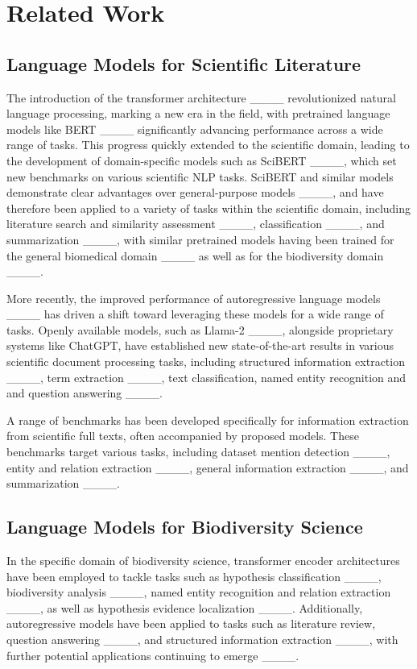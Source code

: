 \section{Related Work}
\label{sec:2}

\subsection{Language Models for Scientific Literature}%

The introduction of the transformer architecture ____ revolutionized natural language processing, marking a new era in the field, with pretrained language models like BERT ____ significantly advancing performance across a wide range of tasks. This progress quickly extended to the scientific domain, leading to the development of domain-specific models such as SciBERT ____, which set new benchmarks on various scientific NLP tasks. SciBERT and similar models demonstrate clear advantages over general-purpose models ____, and have therefore been applied to a variety of tasks within the scientific domain, including literature search and similarity assessment ____, classification ____, and summarization ____, with similar pretrained models having been trained for the general biomedical domain ____ as well as for the biodiversity domain ____.

More recently, the improved performance of autoregressive language models ____ has driven a shift toward leveraging these models for a wide range of tasks. Openly available models, such as Llama-2 ____, alongside proprietary systems like ChatGPT, have established new state-of-the-art results in various scientific document processing tasks, including structured information extraction ____, term extraction ____, text classification, named entity recognition and and question answering ____.

A range of benchmarks has been developed specifically for information extraction from scientific full texts, often accompanied by proposed models. These benchmarks target various tasks, including dataset mention detection ____, entity and relation extraction ____, general information extraction ____, and summarization ____.

\subsection{Language Models for Biodiversity Science}

In the specific domain of biodiversity science, transformer encoder architectures have been employed to tackle tasks such as hypothesis classification ____, biodiversity analysis ____, named entity recognition and relation extraction ____, as well as hypothesis evidence localization ____. Additionally, autoregressive models have been applied to tasks such as literature review, question answering ____, and structured information extraction ____, with further potential applications continuing to emerge ____.
